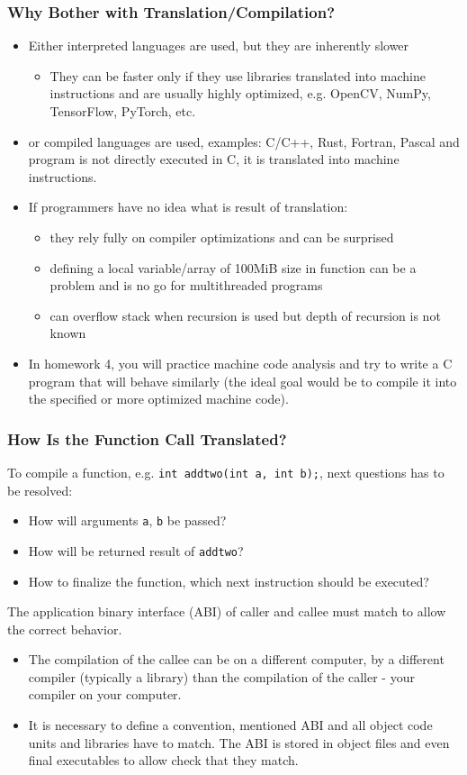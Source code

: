 \documentclass{beamer}
\begin{document}
\begin{frame}
\frametitle{Why Bother with Translation/Compilation?}

\begin{itemize}
 \item Either interpreted languages are used, but they are inherently slower
 \begin{itemize}
 \item They can be faster only if they use libraries translated into machine instructions and are usually highly optimized, e.g. OpenCV, NumPy, TensorFlow, PyTorch, etc.
 \end{itemize}
 \item or compiled languages are used, examples: C/C++, Rust, Fortran, Pascal and program is not directly executed in C, it is translated into machine instructions.
 \item If programmers have no idea what is result of translation:
\begin{itemize}
 \item they rely fully on compiler optimizations and can be surprised
 \item defining a local variable/array of 100MiB size in function can be a problem and is no go for multithreaded programs
 \item can overflow stack when recursion is used but depth of recursion is not known
\end{itemize}
\item In homework 4, you will practice machine code analysis and try to write a C program that will behave similarly (the ideal goal would be to compile it into the specified or more optimized machine code).
\end{itemize}
\end{frame}


\begin{frame}
\frametitle{How Is the Function Call Translated?}

To compile a function, e.g. \texttt{int addtwo(int a, int b);}, next questions has to be resolved:
\begin{itemize}
 \item How will arguments \texttt{a}, \texttt{b} be passed?
 \item How will be returned result of \texttt{addtwo}?
 \item How to finalize the function, which next instruction should be executed?
\end{itemize}

The application binary interface (ABI) of caller and callee must match to allow the correct behavior.
\begin{itemize}
 \item The compilation of the callee can be on a different computer, by a different compiler (typically a library) than the compilation of the caller - your compiler on your computer.
 \item It is necessary to define a convention, mentioned ABI and all object code units and libraries have to match. The ABI is stored in object files and even final executables to allow check that they match.
\end{itemize}
\end{frame}
\end{document}
